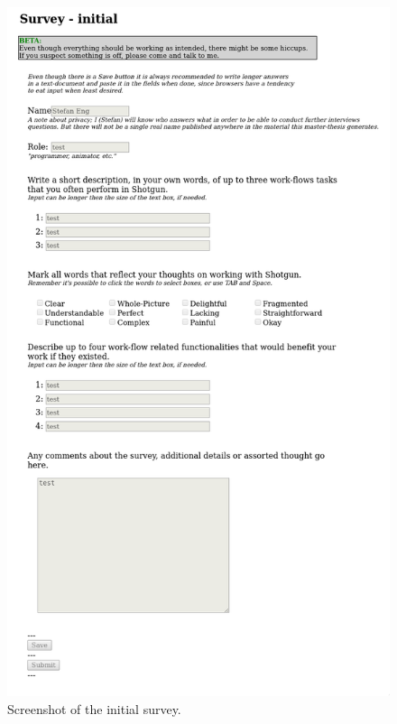     \newpage
    \begin{figure}[H]
      \includegraphics[width=\textwidth,trim={0cm 1cm 0cm 31cm},clip]{images/000_survey_initial.png}
      \caption{Screenshot of the initial survey.}
      \label{fig:ref_fig_survey_initial}
    \end{figure}
